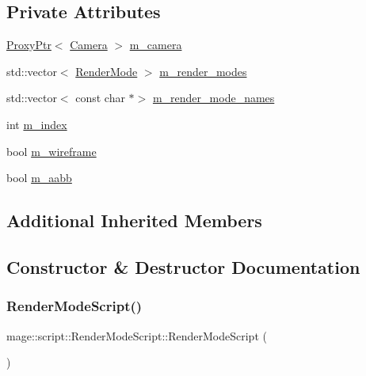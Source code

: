 \subsection*{Private Attributes}
\begin{DoxyCompactItemize}
\item 
\hyperlink{classmage_1_1_proxy_ptr}{Proxy\+Ptr}$<$ \hyperlink{classmage_1_1_camera}{Camera} $>$ \hyperlink{classmage_1_1script_1_1_render_mode_script_af29352d3f14f7456941c3f2d51fe469d}{m\+\_\+camera}
\item 
std\+::vector$<$ \hyperlink{namespacemage_a5e7e18b0154373ce8fc942fe3f6b27fd}{Render\+Mode} $>$ \hyperlink{classmage_1_1script_1_1_render_mode_script_ae00c640a9881be6e4e238c3451236a52}{m\+\_\+render\+\_\+modes}
\item 
std\+::vector$<$ const char $\ast$$>$ \hyperlink{classmage_1_1script_1_1_render_mode_script_a5e83e8a5b6a2ab495b7ede9440520d1b}{m\+\_\+render\+\_\+mode\+\_\+names}
\item 
int \hyperlink{classmage_1_1script_1_1_render_mode_script_a7c18b69323011be23a3ff6148b519619}{m\+\_\+index}
\item 
bool \hyperlink{classmage_1_1script_1_1_render_mode_script_ae17378247a58b28f218085211521d8bd}{m\+\_\+wireframe}
\item 
bool \hyperlink{classmage_1_1script_1_1_render_mode_script_a6b8036624a534f1107ff38744d38f606}{m\+\_\+aabb}
\end{DoxyCompactItemize}
\subsection*{Additional Inherited Members}


\subsection{Constructor \& Destructor Documentation}
\hypertarget{classmage_1_1script_1_1_render_mode_script_a3b0f9d1939b43f2d119124e1324a9f96}{}\label{classmage_1_1script_1_1_render_mode_script_a3b0f9d1939b43f2d119124e1324a9f96} 
\subsubsection{\texorpdfstring{Render\+Mode\+Script()}{RenderModeScript()}\hspace{0.1cm}{\footnotesize\ttfamily [1/3]}}
{\footnotesize\ttfamily mage\+::script\+::\+Render\+Mode\+Script\+::\+Render\+Mode\+Script (\begin{DoxyParamCaption}{ }\end{DoxyParamCaption})}

